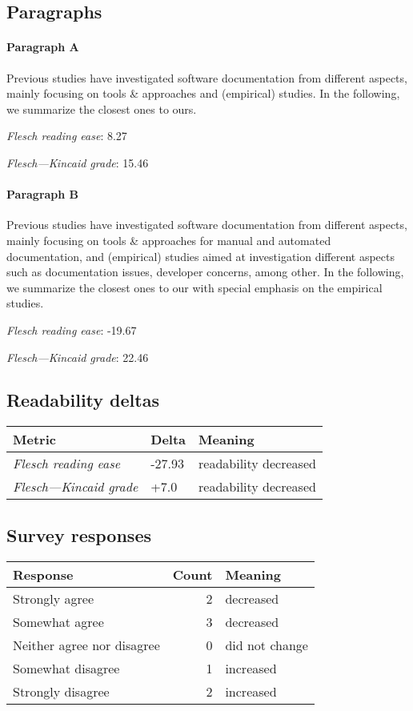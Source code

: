\subsection{Paragraphs}
\paragraph{Paragraph A}
Previous studies have investigated software documentation from different aspects, mainly focusing on tools \& approaches and (empirical) studies. In the following, we summarize the closest ones to ours.\par\medskip
\emph{Flesch reading ease}: 8.27\par
\emph{Flesch---Kincaid grade}: 15.46

\paragraph{Paragraph B}
Previous studies have investigated software documentation from different aspects, mainly focusing on tools \& approaches for manual and automated documentation, and (empirical) studies aimed at investigation different aspects such as documentation issues, developer concerns, among other. In the following, we summarize the closest ones to our with special emphasis on the empirical studies.\par\medskip
\emph{Flesch reading ease}: -19.67\par
\emph{Flesch---Kincaid grade}: 22.46

\subsection{Readability deltas}

\begin{tabular}{lll}
\toprule
               \textbf{Metric} & \textbf{Delta} &       \textbf{Meaning} \\
\midrule
    \emph{Flesch reading ease} &         -27.93 &  readability decreased \\
 \emph{Flesch---Kincaid grade} &           +7.0 &  readability decreased \\
\bottomrule
\end{tabular}

\subsection{Survey responses}
\begin{tabular}{lrl}
\toprule
          \textbf{Response} &  \textbf{Count} & \textbf{Meaning} \\
\midrule
             Strongly agree &               2 &        decreased \\
             Somewhat agree &               3 &        decreased \\
 Neither agree nor disagree &               0 &   did not change \\
          Somewhat disagree &               1 &        increased \\
          Strongly disagree &               2 &        increased \\
\bottomrule
\end{tabular}

